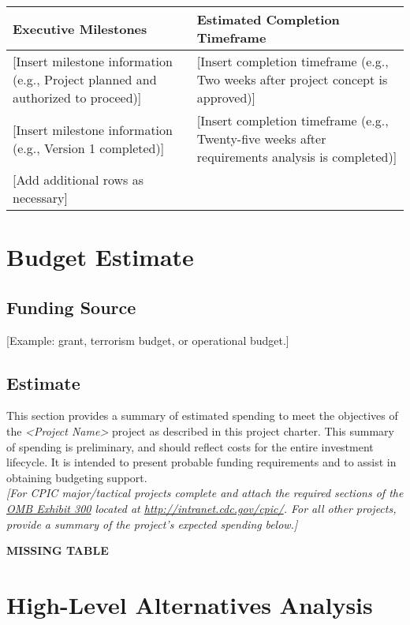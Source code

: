 \documentclass[a4paper, 11pt]{article}
\newcommand{\ra}[1]{\renewcommand{\arraystretch}{#1}}
\begin{document}
\ra{1.3}
\begin{longtable}[]{@{}ll@{}}
  \toprule
  \textbf{Executive Milestones} & \textbf{Estimated Completion Timeframe}\tabularnewline
  \midrule
  \endhead
  {[}Insert milestone information (e.g., Project planned and authorized to
  proceed){]} & {[}Insert completion timeframe (e.g., Two weeks after
  project concept is approved){]}\tabularnewline
  {[}Insert milestone information (e.g., Version 1 completed){]} &
  {[}Insert completion timeframe (e.g., Twenty-five weeks after
  requirements analysis is completed){]}\tabularnewline
  {[}Add additional rows as necessary{]} &\tabularnewline
  \bottomrule
\end{longtable}

\hypertarget{budget-estimate}{%
\section{Budget Estimate}\label{budget-estimate}}

\hypertarget{funding-source}{%
\subsection{Funding Source}\label{funding-source}}

{[}Example: grant, terrorism budget, or operational budget.{]}

\hypertarget{estimate}{%
\subsection{Estimate}\label{estimate}}

This section provides a summary of estimated spending to meet the
objectives of the \emph{\textless{}Project Name\textgreater{}} project
as described in this project charter. This summary of spending is
preliminary, and should reflect costs for the entire investment
lifecycle. It is intended to present probable funding requirements and
to assist in obtaining budgeting support.\\
\emph{{[}For CPIC major/tactical projects complete and attach the
required sections of the \href{http://intranet.cdc.gov/cpic/}{OMB
Exhibit 300} located at \url{http://intranet.cdc.gov/cpic/}. For all
other projects, provide a summary of the project's expected spending}
\emph{below.{]}}

\textbf{MISSING TABLE} %

\hypertarget{high-level-alternatives-analysis}{%
\section{High-Level Alternatives Analysis}\label{high-level-alternatives-analysis}}
\end{document}
